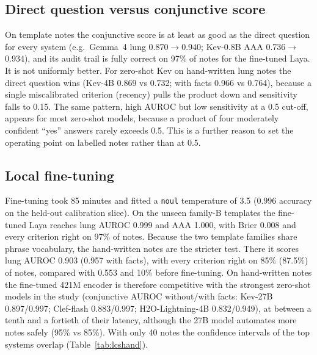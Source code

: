 \documentclass[11pt]{article}
\begin{document}
\subsection{Direct question versus conjunctive score}
\label{sec:res-and}
On template notes the conjunctive score is at least as good as the direct question for every system (e.g.\ Gemma~4 lung 0.870$\rightarrow$0.940; Kev-0.8B AAA 0.736$\rightarrow$0.934), and its audit trail is fully correct on 97\% of notes for the fine-tuned Laya.
It is not uniformly better. For zero-shot Kev on hand-written lung notes the direct question wins (Kev-4B 0.869 vs 0.732; with facts 0.966 vs 0.764), because a single miscalibrated criterion (recency) pulls the product down and sensitivity falls to 0.15.
The same pattern, high AUROC but low sensitivity at a 0.5 cut-off, appears for most zero-shot models, because a product of four moderately confident ``yes'' answers rarely exceeds 0.5. This is a further reason to set the operating point on labelled notes rather than at 0.5.

\subsection{Local fine-tuning}
\label{sec:res-ft}
Fine-tuning took 85 minutes and fitted a \texttt{noul} temperature of 3.5 (0.996 accuracy on the held-out calibration slice).
On the unseen family-B templates the fine-tuned Laya reaches lung AUROC 0.999 and AAA 1.000, with Brier 0.008 and every criterion right on 97\% of notes.
Because the two template families share phrase vocabulary, the hand-written notes are the stricter test.
There it scores lung AUROC 0.903 (0.957 with facts), with every criterion right on 85\% (87.5\%) of notes, compared with 0.553 and 10\% before fine-tuning.
On hand-written notes the fine-tuned 421M encoder is therefore competitive with the strongest zero-shot models in the study (conjunctive AUROC without/with facts: Kev-27B 0.897/0.997; Clef-flash 0.883/0.997; H2O-Lightning-4B 0.832/0.949), at between a tenth and a fortieth of their latency, although the 27B model automates more notes safely (95\% vs 85\%). With only 40 notes the confidence intervals of the top systems overlap (Table~\ref{tab:lcshand}).

\end{document}
